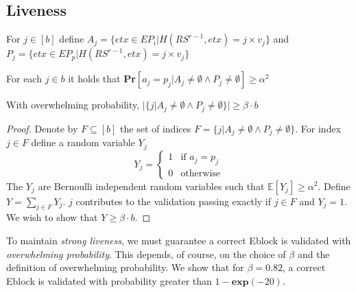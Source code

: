 \subsection{Liveness} \label{Liveness}
For $j\in [b]$ define $A_j=\{etx\in EP_i|H(RS^{r-1},etx)=j\times v_j\}$ and $P_j=\{etx\in EP_p|H(RS^{r-1},etx)=j\times v_j\}$

\begin{lemma}
For each $j\in b$ it holds that \textbf{Pr}$[a_j=p_j|A_j\neq \emptyset \wedge P_j\neq \emptyset]\geq \alpha ^2$ 
\end{lemma}

\begin{lemma}
With overwhelming probability, $|\{j|A_j\neq \emptyset \wedge P_j\neq \emptyset\}|\geq \beta\cdot b$
\end{lemma}
\begin{proof}Denote by $F\subseteq [b]$ the set of indices $F=\{j|A_j\neq \emptyset \wedge P_j\neq \emptyset\}$. For index $j\in F$ define a random variable $Y_j$
\begin{equation}
  Y_j= \begin{cases}
      1  &\mbox{if }  a_j=p_j \\
      0  &\mbox{otherwise}
    \end{cases}
\end{equation}
The $Y_j$ are Bernoulli independent random variables such that $\mathbb{E}[Y_j]\geq \alpha^2$. Define $Y=\sum_{j\in F}{Y_j}$. $j$ contributes to the validation passing exactly if $j\in F$ and $Y_j=1$. We wish to show that $Y\geq \beta\cdot b$. 
\end{proof}
To maintain \emph{strong liveness}, we must guarantee a correct Eblock is validated with \emph{overwhelming probability}. This depends, of course, on the choice of $\beta$ and the definition of overwhelming probability. We show that for $\beta=0.82$, a correct Eblock is validated with probability greater than $1-\textbf{exp}(-20)$.

